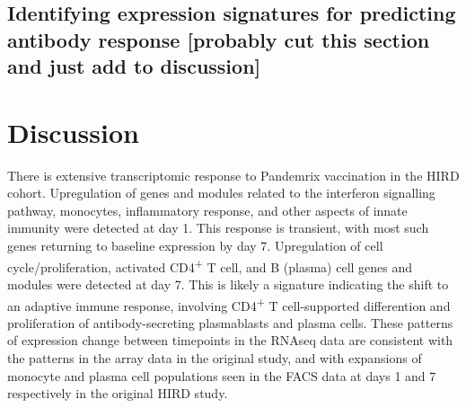 \subsection{Identifying expression signatures for predicting antibody response [probably cut this section and just add to discussion]}

\section{Discussion}

There is extensive transcriptomic response to Pandemrix vaccination in the \gls{HIRD} cohort.
Upregulation of genes and modules related to the interferon signalling pathway, monocytes, inflammatory response, and other aspects of innate immunity were detected at day 1.
This response is transient, with most such genes returning to baseline expression by day 7.
Upregulation of cell cycle/proliferation, activated CD4\textsuperscript{+} T cell, and B (plasma) cell genes and modules were detected at day 7.
This is likely a signature indicating the shift to an adaptive immune response, involving CD4\textsuperscript{+} T cell-supported differention and proliferation of antibody-secreting plasmablasts and plasma cells\autocite{murphy2016JanewayImmunobiology}.
These patterns of expression change between timepoints in the \gls{RNAseq} data are consistent with the patterns in the array data in the original study\autocite{sobolev2016AdjuvantedInfluenzaH1N1Vaccination}, and with expansions of monocyte and plasma cell populations seen in the \gls{FACS} data at days 1 and 7 respectively in the original \gls{HIRD} study\autocite{sobolev2016AdjuvantedInfluenzaH1N1Vaccination}.

